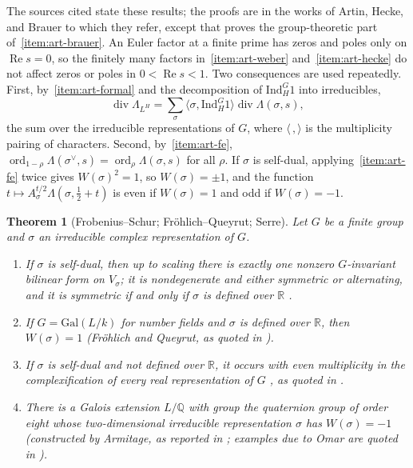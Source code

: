 \documentclass[11pt]{amsart}
\theoremstyle{plain}
\newtheorem{theorem}{Theorem}[section]
\theoremstyle{definition}
\theoremstyle{remark}
\numberwithin{equation}{section}
\newcommand{\R}{\mathbb{R}}
\newcommand{\Q}{\mathbb{Q}}
\DeclareMathOperator{\divisor}{div}
\DeclareMathOperator{\Rea}{Re}
\DeclareMathOperator{\ord}{ord}
\renewcommand{\Re}{\Rea}
\begin{document}
The sources cited state these results; the proofs are in the works of
Artin, Hecke, and Brauer to which they refer, except that
\cite{Kramar2005ArtinBrauer} proves the group-theoretic part
of~\ref{item:art-brauer}. An Euler factor at a finite prime has zeros
and poles only on $\Re s=0$, so the finitely many factors
in~\ref{item:art-weber} and~\ref{item:art-hecke} do not affect zeros or
poles in $0<\Re s<1$. Two consequences are used repeatedly. First,
by~\ref{item:art-formal} and the decomposition of $\mathrm{Ind}_H^G1$
into irreducibles,
\begin{equation}\label{eq:artin-factor}
\divisor\Lambda_{L^H}=\sum_{\sigma}\langle\sigma,
\mathrm{Ind}_H^G1\rangle\divisor\Lambda(\sigma,s),
\end{equation}
the sum over the irreducible representations of $G$, where
$\langle\,,\rangle$ is the multiplicity pairing of characters. Second,
by~\ref{item:art-fe}, $\ord_{1-\rho}\Lambda(\sigma^\vee,s)=
\ord_\rho\Lambda(\sigma,s)$ for all $\rho$. If $\sigma$ is self-dual,
applying~\ref{item:art-fe} twice gives $W(\sigma)^2=1$, so
$W(\sigma)=\pm1$, and the function $t\mapsto A_\sigma^{t/2}
\Lambda(\sigma,\tfrac12+t)$ is even if $W(\sigma)=1$ and odd if
$W(\sigma)=-1$.

\begin{theorem}[{Frobenius--Schur; Fr\"ohlich--Queyrut; Serre}]
\label{thm:imp-fs}
Let $G$ be a finite group and $\sigma$ an irreducible complex
representation of $G$.
\begin{enumerate}[label=(\roman*)]
\item\label{item:fs-form} If $\sigma$ is self-dual, then up to scaling
  there is exactly one nonzero $G$-invariant bilinear form on
  $V_\sigma$; it is nondegenerate and either symmetric or alternating,
  and it is symmetric if and only if $\sigma$ is defined over $\R$
  \cite[Theorem~2.1, p.~2]{ConradFrobeniusSchur}.
\item\label{item:fs-fq} If $G=\mathrm{Gal}(L/k)$ for number fields and
  $\sigma$ is defined over $\R$, then $W(\sigma)=1$ (Fr\"ohlich and
  Queyrut, as quoted in \cite[p.~6]{Deninger2022NoWeil}).
\item\label{item:fs-even} If $\sigma$ is self-dual and not defined over
  $\R$, it occurs with even multiplicity in the complexification of
  every real representation of $G$
  \cite[\S13.2]{Serre1977LinearReps}, as quoted in
  \cite[p.~5]{Deninger2022NoWeil}.
\item\label{item:fs-omar} There is a Galois extension $L/\Q$ with group
  the quaternion group of order eight whose two-dimensional irreducible
  representation $\sigma$ has $W(\sigma)=-1$ (constructed by Armitage,
  as reported in \cite[\S4, p.~29]{Cougnard1983BasesNormales}; examples
  due to Omar are quoted in \cite[p.~5]{Deninger2022NoWeil}).
\end{enumerate}
\end{theorem}
\end{document}
